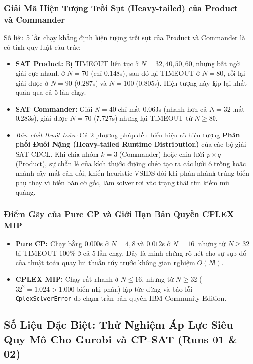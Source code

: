 \documentclass[a4paper,11pt]{article}
\begin{document}
\subsubsection{Giải Mã Hiện Tượng Trồi Sụt (Heavy-tailed) của Product và Commander}
Số liệu 5 lần chạy khẳng định hiện tượng trồi sụt của Product và Commander là có tính quy luật cấu trúc:
\begin{itemize}
    \item \textbf{SAT Product:} Bị TIMEOUT liên tục ở $N = 32, 40, 50, 60$, nhưng bất ngờ giải cực nhanh ở $N = 70$ (chỉ $0.148$s), sau đó lại TIMEOUT ở $N = 80$, rồi lại giải được ở $N = 90$ ($0.287$s) và $N = 100$ ($0.805$s). Hiện tượng này lặp lại nhất quán qua cả 5 lần chạy.
    \item \textbf{SAT Commander:} Giải $N = 40$ chỉ mất $0.063$s (nhanh hơn cả $N = 32$ mất $0.283$s), giải được $N = 70$ ($7.727$s) nhưng lại TIMEOUT từ $N \ge 80$.
    \item \textit{Bản chất thuật toán:} Cả 2 phương pháp đều biểu hiện rõ hiện tượng \textbf{Phân phối Đuôi Nặng (Heavy-tailed Runtime Distribution)} của các bộ giải SAT CDCL. Khi chia nhóm $k=3$ (Commander) hoặc chia lưới $p \times q$ (Product), sự chẵn lẻ của kích thước đường chéo tạo ra các lưới ô trống hoặc nhánh cây mất cân đối, khiến heuristic VSIDS đôi khi phân nhánh trúng biến phụ thay vì biến bàn cờ gốc, làm solver rơi vào trạng thái tìm kiếm mù quáng.
\end{itemize}

\subsubsection{Điểm Gãy của Pure CP và Giới Hạn Bản Quyền CPLEX MIP}
\begin{itemize}
    \item \textbf{Pure CP:} Chạy bằng $0.000$s ở $N=4, 8$ và $0.012$s ở $N=16$, nhưng từ $N \ge 32$ bị TIMEOUT 100\% ở cả 5 lần chạy. Đây là minh chứng rõ nét cho sự sụp đổ của thuật toán quay lui thuần túy trước không gian nghiệm $O(N!)$.
    \item \textbf{CPLEX MIP:} Chạy rất nhanh ở $N \le 16$, nhưng từ $N \ge 32$ ($32^2 = 1.024 > 1.000$ biến nhị phân) lập tức dừng và báo lỗi \texttt{CplexSolverError} do chạm trần bản quyền IBM Community Edition.
\end{itemize}

\subsection{Số Liệu Đặc Biệt: Thử Nghiệm Áp Lực Siêu Quy Mô Cho Gurobi và CP-SAT (Runs 01 \& 02)}
\end{document}
